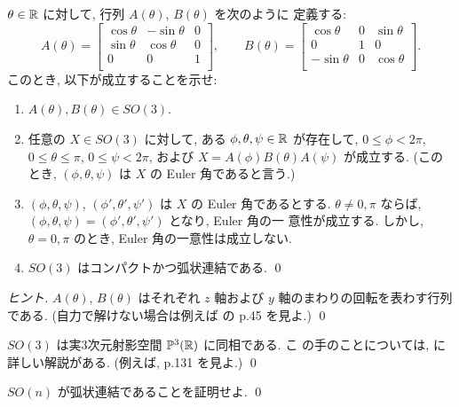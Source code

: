 \documentclass[12pt,twoside]{jarticle}
\begin{document}
\begin{question}
  $\theta \in {\mathbb R}$ に対して, 行列 $A(\theta)$, $B(\theta)$ を次のように
  定義する:
  \[
    A(\theta)
    =
    \begin{bmatrix}
      \cos \theta & - \sin \theta & 0 \\
      \sin \theta &   \cos \theta & 0 \\
           0      &   0           & 1 \\
    \end{bmatrix},
    \qquad
    B(\theta)
    =
    \begin{bmatrix}
        \cos \theta & 0 & \sin \theta \\
             0      & 1 &      0      \\
      - \sin \theta & 0 & \cos \theta \\
    \end{bmatrix}.
  \]
  このとき, 以下が成立することを示せ:
  \begin{enumerate}
  \item $A(\theta), B(\theta) \in SO(3)$.
  \item 任意の $X \in SO(3)$ に対して, %
    ある $\phi, \theta, \psi \in {\mathbb R}$ が存在して, %
    $0 \le \phi < 2\pi$, $0 \le \theta \le \pi$, $0 \le \psi < 2\pi$, 
    および $X = A(\phi)B(\theta)A(\psi)$ が成立する. %
    (このとき, $(\phi, \theta, \psi)$ は $X$ の Euler 角であると言う.)
  \item $(\phi,\theta,\psi)$, $(\phi',\theta',\psi')$ は $X$ の Euler 
    角であるとする. $\theta \ne 0, \pi$ ならば, %
    $(\phi,\theta,\psi) = (\phi',\theta',\psi')$ となり, Euler 角の一
    意性が成立する. %
    しかし, $\theta = 0, \pi$ のとき, Euler 角の一意性は成立しない.
  \item $SO(3)$ はコンパクトかつ弧状連結である.
    \qed
  \end{enumerate}
\end{question}

\begin{proof}[ヒント]
$A(\theta)$, $B(\theta)$ はそれぞれ $z$ 軸および $y$
軸のまわりの回転を表わす行列である. (自力で解けない場合は例えば 
\cite{YS} の p.45 を見よ.)
\qed 
\end{proof}

\begin{rem}
$SO(3)$ は実3次元射影空間 ${\mathbb P}^3({\mathbb R})$ に同相である. こ
の手のことについては, \cite{Yokota} に詳しい解説がある. (例えば, p.131 
を見よ.)
\qed 
\end{rem}

\begin{question}
  $SO(n)$ が弧状連結であることを証明せよ. \qed
\end{question}
\end{document}
